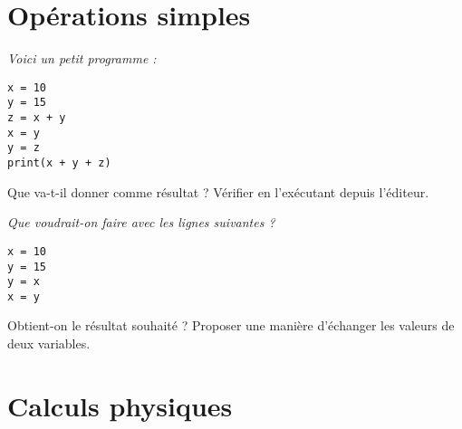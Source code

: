 \section{Opérations simples}
\begin{Exercise}
{\it 
Voici un petit programme :
\begin{lstlisting}
x = 10
y = 15
z = x + y
x = y
y = z
print(x + y + z)
\end{lstlisting}

Que va-t-il donner comme résultat ? Vérifier en l'exécutant depuis l'éditeur.
}
\end{Exercise}
\begin{Exercise}
{\it Que voudrait-on faire avec les lignes suivantes ?
\begin{lstlisting}
x = 10
y = 15
y = x
x = y
\end{lstlisting}

Obtient-on le résultat souhaité ? Proposer une manière d'échanger les valeurs de deux variables.}
\end{Exercise}
\section{Calculs physiques}
